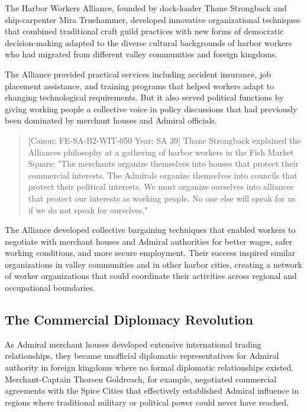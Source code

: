 The Harbor Workers Alliance, founded by dock-loader Thane Strongback and
ship-carpenter Mira Truehammer, developed innovative organizational
techniques that combined traditional craft guild practices with new
forms of democratic decision-making adapted to the diverse cultural
backgrounds of harbor workers who had migrated from different valley
communities and foreign kingdoms.

The Alliance provided practical services including accident insurance,
job placement assistance, and training programs that helped workers
adapt to changing technological requirements. But it also served
political functions by giving working people a collective voice in
policy discussions that had previously been dominated by merchant houses
and Admiral officials.

\begin{quote}
{[}Canon: FE-SA-B2-WIT-050 \textbar{} Year: SA 39{]} Thane Strongback
explained the Alliance\textquotesingle s philosophy at a gathering of
harbor workers in the Fish Market Square: "The merchants organize
themselves into houses that protect their commercial interests. The
Admirals organize themselves into councils that protect their political
interests. We must organize ourselves into alliances that protect our
interests as working people. No one else will speak for us if we do not
speak for ourselves."
\end{quote}

The Alliance developed collective bargaining techniques that enabled
workers to negotiate with merchant houses and Admiral authorities for
better wages, safer working conditions, and more secure employment.
Their success inspired similar organizations in valley communities and
in other harbor cities, creating a network of worker organizations that
could coordinate their activities across regional and occupational
boundaries.

\subsection{The Commercial Diplomacy
Revolution}\label{the-commercial-diplomacy-revolution}

As Admiral merchant houses developed extensive international trading
relationships, they became unofficial diplomatic representatives for
Admiral authority in foreign kingdoms where no formal diplomatic
relationships existed. Merchant-Captain Thorsen Goldreach, for example,
negotiated commercial agreements with the Spice Cities that effectively
established Admiral influence in regions where traditional military or
political power could never have reached.

